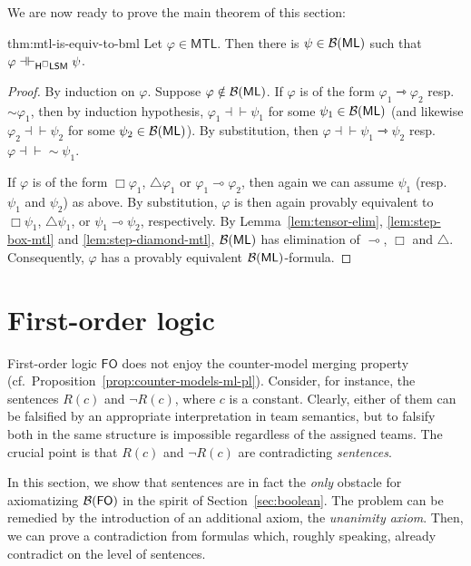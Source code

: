 \documentclass[a4paper,english,fleqn,11pt,final]{scrartcl}
\newcommand{\negg}{{\sim}}
\newcommand{\logic}[1]{\ensuremath{\mathsf{#1}}\xspace}
\newcommand{\ML}{\logic{ML}}
\newcommand{\FO}{\logic{FO}}
\newcommand{\MTL}{\logic{MTL}}
\newcommand{\calB}{\protect\ensuremath{\mathcal{B}}}
\newcommand{\sfS}{\protect\ensuremath{\mathsf{S}}}
\newcommand{\sfH}{\protect\ensuremath{\mathsf{H}}}
\newcommand{\sfL}{\protect\ensuremath{\mathsf{L}}}
\newcommand{\sfM}{\protect\ensuremath{\mathsf{M}}}
\newcommand{\limp}{\multimap}
\newcommand{\timp}{\rightarrowtriangle}
\newcommand{\eqpr}{\dashv\vdash}
\theoremstyle{plain}
\theoremstyle{definition}
\begin{document}
We are now ready to prove the main theorem of this section:

\begin{reptheorem}{thm:mtl-is-equiv-to-bml}
Let $\varphi \in \MTL$.
Then there is $\psi \in \calB(\ML)$ such that $\varphi \eqpr_{\sfH^\Box\sfL\sfS\sfM} \psi$.
\end{reptheorem}
\begin{proof}
By induction on $\varphi$.
Suppose $\varphi \notin \calB(\ML)$.
If $\varphi$ is of the form $\varphi_1 \timp \varphi_2$ resp.\ $\negg\varphi_1$, then by induction hypothesis, $\varphi_1 \eqpr \psi_1$ for some $\psi_1 \in \calB(\ML)$ (and likewise $\varphi_2 \eqpr \psi_2$ for some $\psi_2 \in \calB(\ML)$).
By substitution, then $\varphi \eqpr \psi_1 \timp \psi_2$ resp.\ $\varphi \eqpr \negg \psi_1$.

If $\varphi$ is of the form $\Box\varphi_1$, $\triangle\varphi_1$ or $\varphi_1 \limp \varphi_2$, then again we can assume $\psi_1$ (resp.\ $\psi_1$ and $\psi_2$) as above.
By substitution, $\varphi$ is then again provably equivalent to $\Box\psi_1$, $\triangle\psi_1$, or $\psi_1 \limp \psi_2$, respectively.
By Lemma~\ref{lem:tensor-elim}, \ref{lem:step-box-mtl} and \ref{lem:step-diamond-mtl},
 $\calB(\ML)$ has elimination of $\limp$, $\Box$ and $\triangle$.
Consequently, $\varphi$ has a provably equivalent $\calB(\ML)$-formula.
\end{proof}
 
\section{First-order logic}

\label{sec:fo}

First-order logic $\FO$ does not enjoy the counter-model merging property (cf.\ Proposition~\ref{prop:counter-models-ml-pl}).
Consider, for instance, the sentences $R(c)$ and $\neg R(c)$, where $c$ is a constant.
Clearly, either of them can be falsified by an appropriate interpretation in team semantics, but to falsify both in the same structure is impossible regardless of the assigned teams.
The crucial point is that $R(c)$ and $\neg R(c)$ are contradicting \emph{sentences}.

In this section, we show that sentences are in fact the \emph{only} obstacle for axiomatizing $\calB(\FO)$ in the spirit of Section~\ref{sec:boolean}.
The problem can be remedied by the introduction of an additional axiom, the \emph{unanimity axiom}.
Then, we can prove a contradiction from formulas which, roughly speaking, already contradict on the level of sentences.
\end{document}
